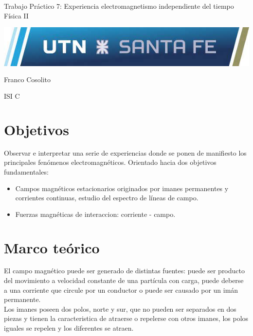 \documentclass[11pt, letterpaper]{article}
\newcommand\vspt{15pt}
\newcommand\tpn{7}
\newcommand\tptitle{Experiencia electromagnetismo independiente del tiempo}
\newcommand\tpsubj{Física II}
\begin{document}
\thispagestyle{empty}

\begin{center}\Huge{Trabajo Práctico \tpn: \tptitle\\
\vspace{\vspt}
\tpsubj}\end{center}

\vspace{\vspt}
\includegraphics[width=\linewidth]{utnlogo}

\vspace{\vspt}
\begin{center}\Huge{Franco Cosolito}\end{center}

\vspace{\vspt}
\begin{center}\Large{ISI C}\end{center}
\pagebreak

\setcounter{page}{1}
\section{Objetivos}
Observar e interpretar una serie de experiencias donde se ponen de 
manifiesto los principales fenómenos electromagnéticos. Orientado
hacia dos objetivos fundamentales: 
\begin{itemize}
    \item Campos magnéticos estacionarios originados por imanes
        permanentes y corrientes continuas, estudio del espectro
        de líneas de campo.
    \item Fuerzas magnéticas de interaccion: corriente - campo.
\end{itemize}

\section{Marco teórico}
El campo magnético puede ser generado de distintas fuentes: puede ser
producto del movimiento a velocidad constante de una partícula con carga,
puede deberse a una corriente que circule por un conductor o puede ser
causado por un imán permanente.\\
Los imanes poseen dos polos, norte y sur, que no pueden ser separados en
dos piezas y tienen la caracteristica de atraerse o repelerse con otros
imanes, los polos iguales se repelen y los diferentes se atraen.
\end{document}
